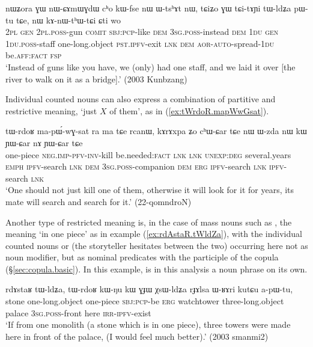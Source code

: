 \begin{exe}
	\ex \label{ex:tAYi.tWldZa}
	\gll nɯʑora ɣɯ nɯ-ɕɤmɯɣdɯ cʰo kɯ-fse nɯ ɯ-tsʰɤt nɯ, tɕiʑo ɣɯ tɕi-tɤɲi tɯ-ldʑa pɯ-tu tɕe, nɯ kɤ-nɯ-tʰɯ-tɕi ɕti wo \\
	\textsc{2pl} \textsc{gen} \textsc{2pl}.\textsc{poss}-gun \textsc{comit} \textsc{sbj}:\textsc{pcp}-like \textsc{dem} \textsc{3sg}.\textsc{poss}-instead \textsc{dem}  \textsc{1du} \textsc{gen} \textsc{1du}.\textsc{poss}-staff one-long.object \textsc{pst}.\textsc{ipfv}-exit \textsc{lnk} \textsc{dem} \textsc{aor}-\textsc{auto}-spread-\textsc{1du} be.\textsc{aff}:\textsc{fact} \textsc{fsp} \\
	\glt `Instead of guns like you have, we (only) had one staff, and we laid it over [the river to walk on it as a bridge].' (2003 Kunbzang)
\end{exe} 

Individual counted nouns can also express a combination of partitive and restrictive meaning, `just $X$ of them', as in (\ref{ex:tWrdoR.mapWwGsat}).

\begin{exe}
	\ex \label{ex:tWrdoR.mapWwGsat}
	\gll 
	tɯ-rdoʁ ma-pɯ́-wɣ-sat ra ma tɕe rcanɯ, kɤrɤxpa ʑo cʰɯ-ɕar tɕe nɯ ɯ-zda nɯ kɯ ɲɯ-ɕar nɤ ɲɯ-ɕar tɕe \\
	one-piece \textsc{neg}.\textsc{imp}-\textsc{pfv}-\textsc{inv}-kill be.needed:\textsc{fact} \textsc{lnk} \textsc{lnk} \textsc{unexp}:\textsc{deg} several.years \textsc{emph} \textsc{ipfv}-search \textsc{lnk} \textsc{dem} \textsc{3sg}.\textsc{poss}-companion \textsc{dem} \textsc{erg} \textsc{ipfv}-search \textsc{lnk} \textsc{ipfv}-search \textsc{lnk} \\
	\glt `One should not just kill one of them, otherwise it will look for it for years, its mate will search and search for it.' (22-qomndroN)
\end{exe}

Another type of restricted meaning is, in the case of mass nouns such as , the meaning `in one piece' as in example (\ref{ex:rdAstaR.tWldZa}), with the individual counted nouns  or  (the storyteller hesitates between the two) occurring here not as noun modifier, but as nominal predicates with the participle of the copula  (§\ref{sec:copula.basic}). In this example,  is in this analysis a noun phrase on its own.

\begin{exe}
	\ex \label{ex:rdAstaR.tWldZa}
	\gll rdɤstaʁ tɯ-ldʑa, tɯ-rdoʁ kɯ-ŋu kɯ ɣɟɯ χsɯ-ldʑa rɟɤlsa ɯ-ʁɤri kutɕu a-pɯ-tu, \\
	stone one-long.object one-piece \textsc{sbj}:\textsc{pcp}-be \textsc{erg} watchtower three-long.object palace \textsc{3sg}.\textsc{poss}-front here \textsc{irr}-\textsc{ipfv}-exist \\
	\glt `If from one monolith (a stone which is in one piece), three  towers were made here in front of the palace, (I would feel much better).'  (2003 smanmi2)
\end{exe} 

